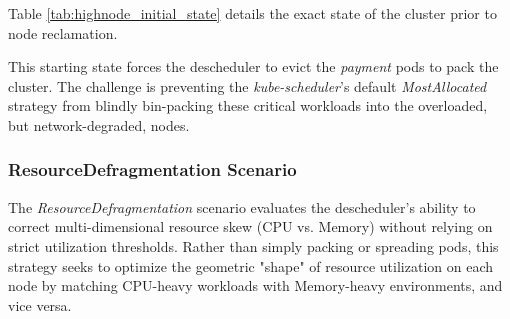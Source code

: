 Table \ref{tab:highnode_initial_state} details the exact state of the cluster prior to node reclamation.

\begin{table}[H]
    \centering
    \caption{Resource Allocation: Initial State for HighNodeUtilization Strategy}
    \label{tab:highnode_initial_state}
\end{table}

This starting state forces the descheduler to evict the \textit{payment} pods to pack the cluster. The challenge is preventing the \textit{kube-scheduler}'s default \textit{MostAllocated} strategy from blindly bin-packing these critical workloads into the overloaded, but network-degraded, nodes.

\subsubsection{ResourceDefragmentation Scenario}
\label{subsubsec:netaware4_workload_imbalance}
The \textit{ResourceDefragmentation} scenario evaluates the descheduler's ability to correct multi-dimensional resource skew (CPU vs. Memory) without relying on strict utilization thresholds. Rather than simply packing or spreading pods, this strategy seeks to optimize the geometric "shape" of resource utilization on each node by matching CPU-heavy workloads with Memory-heavy environments, and vice versa.

